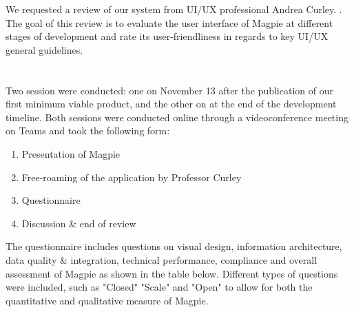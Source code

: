 We requested a review of our system from UI/UX professional Andrea Curley. .\\
The goal of this review is to evaluate the user interface of Magpie at different stages of development and rate its user-friendliness in regards to key UI/UX general guidelines.\\
 \\ \\

Two session were conducted: one on November 13 after the publication of our first minimum viable product, and the other on  at the end of the development timeline. Both sessions were conducted online through a videoconference meeting on Teams and took the following form:
\begin{enumerate}
    \item Presentation of Magpie
    \item Free-roaming of the application by Professor Curley
    \item Questionnaire
    \item Discussion \& end of review
\end{enumerate}
The questionnaire includes questions on visual design, information architecture, data quality \& integration, technical performance, compliance and overall assessment of Magpie as shown in the table below. Different types of questions were included, such as "Closed" "Scale" and "Open" to allow for both the quantitative and qualitative measure of Magpie. \\ \\
